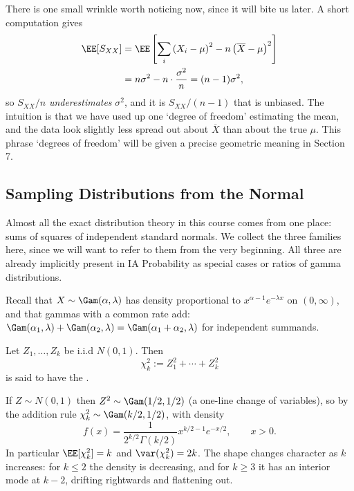 There is one small wrinkle worth noticing now, since it will bite us later. A short computation gives
\begin{align*}
  \EE[S_{XX}] &= \EE\left[\sum_i \left(X_i - \mu\right)^2 - n \left(\overline{X} - \mu\right)^2 \right]\\
  &= n \sigma^2 - n \cdot \frac{\sigma^2}{n} = (n-1)\sigma^2,
\end{align*}
so $S_{XX}/n$ \emph{underestimates} $\sigma^2$, and it is $S_{XX}/(n-1)$ that is unbiased. The intuition is that we have used up one `degree of freedom' estimating the mean, and the data look slightly less spread out about $\overline{X}$ than about the true $\mu$. This phrase `degrees of freedom' will be given a precise geometric meaning in Section 7.

\subsection{Sampling Distributions from the Normal}

Almost all the exact distribution theory in this course comes from one place: sums of squares of independent standard normals. We collect the three families here, since we will want to refer to them from the very beginning. All three are already implicitly present in IA Probability as special cases or ratios of gamma distributions.

Recall that $X \sim \Gam(\alpha, \lambda)$ has density proportional to $x^{\alpha - 1}e^{-\lambda x}$ on $(0, \infty)$, and that gammas with a common rate add: $\Gam(\alpha_1, \lambda) + \Gam(\alpha_2, \lambda) = \Gam(\alpha_1 + \alpha_2, \lambda)$ for independent summands.

\begin{definition}
  Let $Z_1, \dots, Z_k$ be i.i.d $N(0,1)$. Then
  $$
  \chi^2_k := Z_1^2 + \cdots + Z_k^2
  $$
  is said to have the .
\end{definition}

If $Z \sim N(0,1)$ then $Z^2 \sim \Gam(1/2, 1/2)$ (a one-line change of variables), so by the addition rule $\chi^2_k \sim \Gam(k/2, 1/2)$, with density
$$
f(x) = \frac{1}{2^{k/2}\Gamma(k/2)} x^{k/2 - 1}e^{-x/2}, \qquad x > 0.
$$
In particular $\EE[\chi^2_k] = k$ and $\var(\chi^2_k) = 2k$. The shape changes character as $k$ increases: for $k \leq 2$ the density is decreasing, and for $k \geq 3$ it has an interior mode at $k - 2$, drifting rightwards and flattening out.

